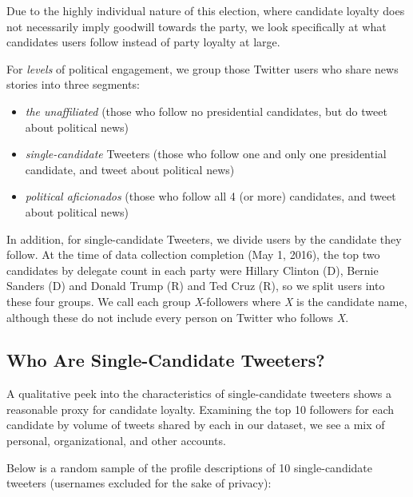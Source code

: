 Due to the highly individual nature of this election, where candidate loyalty does not necessarily imply goodwill towards the party, we look specifically at what candidates users follow instead of party loyalty at large. 

For \emph{levels} of political engagement, we group those Twitter users who share news stories into three segments: 

\begin{itemize}
  \item \emph{the unaffiliated} (those who follow no presidential candidates, but do tweet about political news)
  \item \emph{single-candidate} Tweeters (those who follow one and only one presidential candidate, and tweet about political news)
  \item \emph{political aficionados} (those who follow all 4 (or more) candidates, and tweet about political news)
\end{itemize}

In addition, for single-candidate Tweeters, we divide users by the candidate they follow. At the time of data collection completion (May 1, 2016), the top two candidates by delegate count in each party were Hillary Clinton (D), Bernie Sanders (D) and Donald Trump (R) and Ted Cruz (R), so we split users into these four groups. We call each group \emph{X}-followers where \emph{X} is the candidate name, although these do not include every person on Twitter who follows \emph{X}.  


\subsection{Who Are Single-Candidate Tweeters?}
A qualitative peek into the characteristics of single-candidate tweeters shows a reasonable proxy for candidate loyalty. Examining the top 10 followers for each candidate by volume of tweets shared by each in our dataset, we see a mix of personal, organizational, and other accounts.

Below is a random sample of the profile descriptions of 10 single-candidate tweeters (usernames excluded for the sake of privacy):
 

